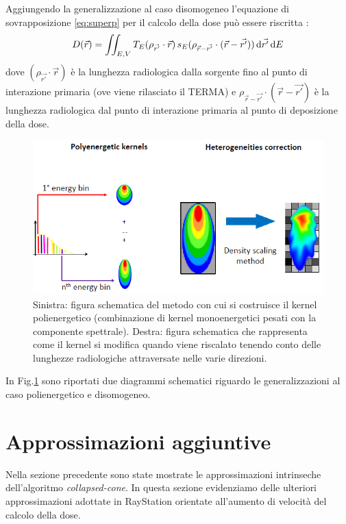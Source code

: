 {Aggiungendo  la generalizzazione al caso disomogeneo l'equazione di sovrapposizione \eqref{eq:superp} per il calcolo della dose può essere riscritta \cite{Khan2010}:
\begin{equation}
D(\vec{r}) = \iint_{E,V} T_E(\rho_{\vec{r'}} \cdot \vec{r})\, s_E(\rho_{\vec{r}-\vec{r'}}\cdot (\vec{r}-\vec{r'}))\,\text{d}\vec{r'} \,\text{d} E
\end{equation}
dove $(\rho_{\vec{r'}} \cdot \vec{r})$ è la lunghezza radiologica dalla sorgente fino al punto di interazione primaria (ove viene rilasciato il TERMA) e $\rho_{\vec{r}-\vec{r'}}\cdot (\vec{r}-\vec{r'})$ è la lunghezza radiologica dal punto di interazione primaria al punto di deposizione della dose.
\begin{figure}
\centering
\includegraphics[width=\textwidth]{./cap1/kern_trans.png}
\caption{Sinistra: figura schematica del metodo con cui si costruisce il kernel polienergetico (combinazione di kernel monoenergetici pesati con la componente spettrale). Destra: figura schematica che rappresenta come il kernel si modifica quando viene riscalato tenendo conto delle lunghezze radiologiche attraversate nelle varie direzioni.}
\label{fig:kern_trans}
\end{figure}

In Fig.\ref{fig:kern_trans} sono riportati due diagrammi schematici riguardo le generalizzazioni al caso polienergetico e disomogeneo.


\section{Approssimazioni aggiuntive}
Nella sezione precedente sono state mostrate le approssimazioni intrinseche dell'algoritmo \textit{collapsed-cone}. In questa sezione evidenziamo delle ulteriori approssimazioni adottate in RayStation orientate all'aumento di velocità del calcolo della dose.

}
